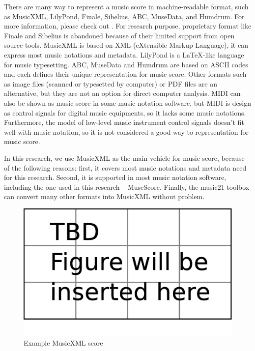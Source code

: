 There are many way to represent a music score in machine-readable format, such as MusicXML\cite{Good2001}, LilyPond\cite{LilyPond}, Finale, Sibelius, ABC, MuseData, and Humdrum. For more information, please check out \cite{Selfridge-Field1997}. For research purpose, proprietary format like Finale and Sibelius is abandoned because of their limited support from open source tools. MusicXML is based on XML (eXtensible Markup Language), it can express most music notations and metadata. LilyPond is a \LaTeX-like language for music typesetting. ABC, MuseData and Humdrum are based on ASCII codes and each defines their unique representation for music score. 
Other formats such as image files (scanned or typesetted by computer) or PDF files are an alternative, but they are not an option for direct computer analysis. MIDI can also be shown as music score in some music notation software, but MIDI is design as control signals for digital music equipments, so it lacks some music notations. Furthermore, the model of low-level music instrument control signals doesn't fit well with music notation, so it is not considered a good way to representation for music score.

In this research, we use MusicXML as the main vehicle for music score, because of the following reasons: first, it covers most music notations and metadata need for this research. Second, it is supported in most music notation software, including the one used in this research -- MuseScore. Finally, the music21 toolbox can convert many other formats into MusicXML without problem.
 

\begin{figure}[tp]
   \begin{center}
      \includegraphics[width=\textwidth]{fig/TBDFigure}

   \end{center}
   \caption{Example MusicXML score}
   \label{fig:expxml}
\end{figure}

